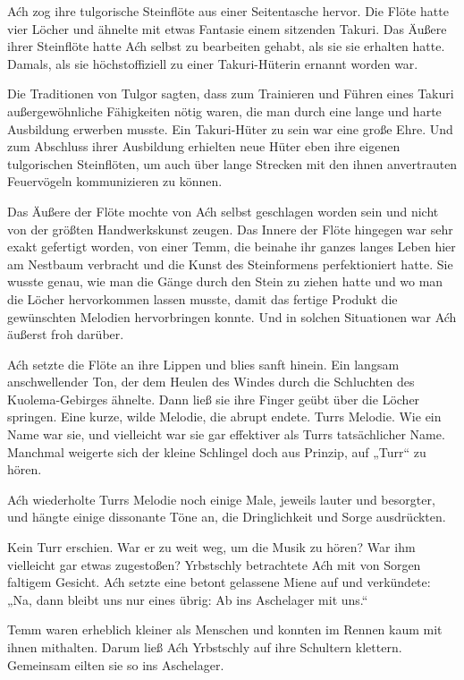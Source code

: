 Aćh zog ihre tulgorische Steinflöte aus einer Seitentasche hervor. Die Flöte hatte vier Löcher und ähnelte mit etwas Fantasie einem sitzenden Takuri. Das Äußere ihrer Steinflöte hatte Aćh selbst zu bearbeiten gehabt, als sie sie erhalten hatte. Damals, als sie höchstoffiziell zu einer Takuri-Hüterin ernannt worden war.

Die Traditionen von Tulgor sagten, dass zum Trainieren und Führen eines Takuri außergewöhnliche Fähigkeiten nötig waren, die man durch eine lange und harte Ausbildung erwerben musste. Ein Takuri-Hüter zu sein war eine große Ehre. Und zum Abschluss ihrer Ausbildung erhielten neue Hüter eben ihre eigenen tulgorischen Steinflöten, um auch über lange Strecken mit den ihnen anvertrauten Feuervögeln kommunizieren zu können.

Das Äußere der Flöte mochte von Aćh selbst geschlagen worden sein und nicht von der größten Handwerkskunst zeugen. Das Innere der Flöte hingegen war sehr exakt gefertigt worden, von einer Temm, die beinahe ihr ganzes langes Leben hier am Nestbaum verbracht und die Kunst des Steinformens perfektioniert hatte. Sie wusste genau, wie man die Gänge durch den Stein zu ziehen hatte und wo man die Löcher hervorkommen lassen musste, damit das fertige Produkt die gewünschten Melodien hervorbringen konnte. Und in solchen Situationen war Aćh äußerst froh darüber.

Aćh setzte die Flöte an ihre Lippen und blies sanft hinein. Ein langsam anschwellender Ton, der dem Heulen des Windes durch die Schluchten des Kuolema-Gebirges ähnelte. Dann ließ sie ihre Finger geübt über die Löcher springen. Eine kurze, wilde Melodie, die abrupt endete. Turrs Melodie. Wie ein Name war sie, und vielleicht war sie gar effektiver als Turrs tatsächlicher Name. Manchmal weigerte sich der kleine Schlingel doch aus Prinzip, auf „Turr“ zu hören.

Aćh wiederholte Turrs Melodie noch einige Male, jeweils lauter und besorgter, und hängte einige dissonante Töne an, die Dringlichkeit und Sorge ausdrückten.

Kein Turr erschien. War er zu weit weg, um die Musik zu hören? War ihm vielleicht gar etwas zugestoßen? Yrbstschly betrachtete Aćh mit von Sorgen faltigem Gesicht. Aćh setzte eine betont gelassene Miene auf und verkündete: „Na, dann bleibt uns nur eines übrig: Ab ins Aschelager mit uns.“

Temm waren erheblich kleiner als Menschen und konnten im Rennen kaum mit ihnen mithalten. Darum ließ Aćh Yrbstschly auf ihre Schultern klettern. Gemeinsam eilten sie so ins Aschelager.

